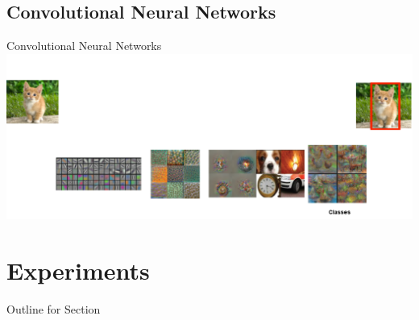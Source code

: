 \documentclass{beamer}
\begin{document}
\begin{darkframes}
	\subsection{Convolutional Neural Networks}
		\begin{frame}{Convolutional Neural Networks}
	\includegraphics[width=\textwidth]{fig/cnn_mine}
\end{frame}

    \section{Experiments}
        \begin{frame}{Outline for Section \thesection}
    \tableofcontents[currentsection]
\end{frame}

\end{darkframes}
\end{document}

